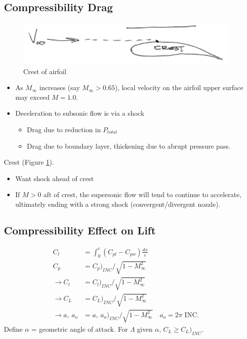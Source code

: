\documentclass[draft=false, titlepage]{article}
\begin{document}
\subsection{Compressibility Drag}
\begin{figure}[ht]
	\centering
	\includegraphics[width=0.6\linewidth]{Figures/p56_crest.PNG}
	\caption{Crest of airfoil}
	\label{fig:p56_crest}
\end{figure}
\begin{itemize}
\item As $M_\infty$ increases (say $M_\infty > 0.65$), local velocity on the airfoil upper surface may exceed $M=1.0$.
\item Deceleration to subsonic flow is via a shock
\begin{itemize}
	\item Drag due to reduction in $P_{total}$
	\item Drag due to boundary layer, thickening due to abrupt pressure pass.
\end{itemize}
\end{itemize}
Crest (Figure \ref{fig:p56_crest}).
\begin{itemize}
	\item Want shock ahead of crest
	\item If $M>0$ aft of crest, the supersonic flow will tend to continue to accelerate, ultimately ending with a strong shock (convergent/divergent nozzle).
\end{itemize}

\subsection{Compressibility Effect on Lift}
\begin{align*}
C_l &= \int_0^c (C_{pl} - C_{pw}) \frac{dx}{c}\\
C_p &= C_p\Big)_{INC}/\sqrt{1-M_\infty^2}\\
\rightarrow C_l &= C_l\Big)_{INC}/\sqrt{1-M_\infty^2}\\
\rightarrow C_L &= C_L\Big)_{INC}/\sqrt{1-M_\infty^2}\\
\rightarrow a,\ a_o &= a,\ a_o\Big)_{INC}/\sqrt{1-M_\infty^2} \quad \boxed{a_o = 2\pi}\text{ INC.}
\end{align*}
Define $\alpha$ = geometric angle of attack. For $\Lambda$ given $\alpha$, $C_L \ge C_L\Big)_{INC}$.
\end{document}
